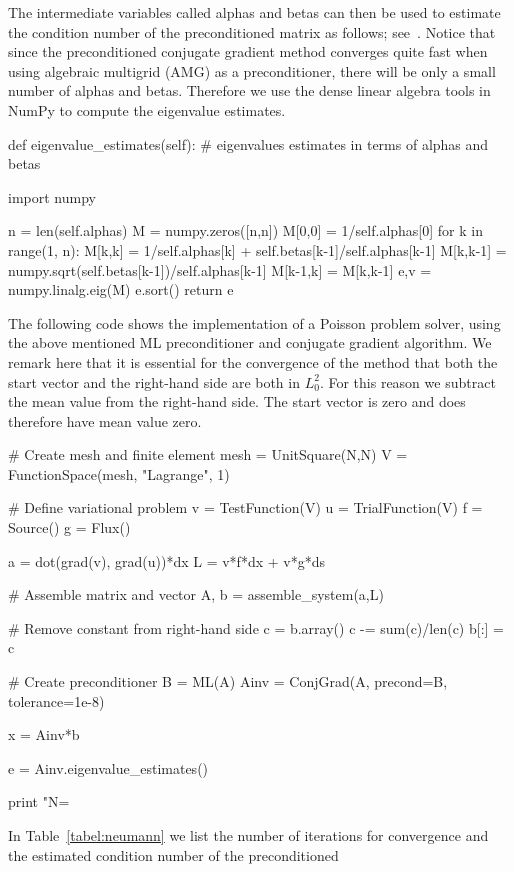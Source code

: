 The intermediate variables called alphas and betas can then be used to
estimate the condition number of the preconditioned matrix as follows;
see~\citet{Saad2003}.  Notice that since the preconditioned
conjugate gradient method converges quite fast when using algebraic
multigrid (AMG) as a preconditioner, there will be only a
small number of alphas and betas. Therefore we use the dense linear
algebra tools in NumPy to compute the eigenvalue estimates.
\begin{python}
def eigenvalue_estimates(self):
    # eigenvalues estimates in terms of alphas and betas

    import numpy

    n = len(self.alphas)
    M = numpy.zeros([n,n])
    M[0,0] = 1/self.alphas[0]
    for k in range(1, n):
        M[k,k] = 1/self.alphas[k] + self.betas[k-1]/self.alphas[k-1]
        M[k,k-1] = numpy.sqrt(self.betas[k-1])/self.alphas[k-1]
        M[k-1,k] = M[k,k-1]
    e,v = numpy.linalg.eig(M)
    e.sort()
    return e
\end{python}
The following code shows the implementation of a Poisson problem
solver, using the above mentioned ML preconditioner and conjugate
gradient algorithm. We remark here that it is essential for the
convergence of the method that both the start vector and the
right-hand side are both in $L^2_0$. For this reason we subtract the
mean value from the right-hand side. The start vector is zero and
does therefore have mean value zero.
\begin{python}
# Create mesh and finite element
mesh = UnitSquare(N,N)
V = FunctionSpace(mesh, "Lagrange", 1)

# Define variational problem
v = TestFunction(V)
u = TrialFunction(V)
f = Source()
g = Flux()

a = dot(grad(v), grad(u))*dx
L = v*f*dx + v*g*ds

# Assemble matrix and vector
A, b = assemble_system(a,L)

# Remove constant from right-hand side
c = b.array()
c -= sum(c)/len(c)
b[:] = c

# Create preconditioner
B = ML(A)
Ainv = ConjGrad(A, precond=B, tolerance=1e-8)

x = Ainv*b

e = Ainv.eigenvalue_estimates()

print "N=%
\end{python}
In Table~\ref{tabel:neumann} we list the number of iterations for
convergence and the estimated condition number of the preconditioned
